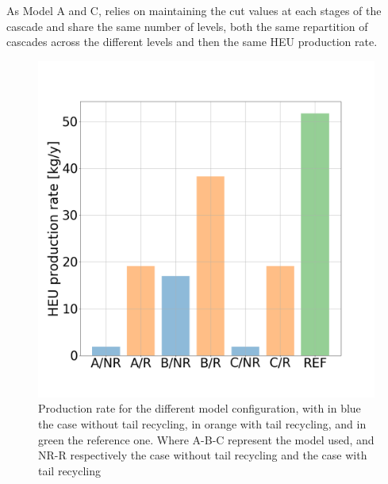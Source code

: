 As Model A and C, relies on maintaining the cut values at each stages of the
cascade and share the same number of levels, both the  same repartition of
cascades across the different levels and then the same \gls{HEU} production
rate.

\begin{figure}[h!] %
    \centering
    \includegraphics[scale=0.25]{HEU_prod_rate}
    \caption{Production rate for the different model configuration, with in blue
    the case without tail recycling, in orange with tail recycling, and in green
    the reference one. Where A-B-C represent the model used, and NR-R
    respectively the case without tail recycling and the case with tail recycling}
    \label{fig:HEU_rate}
\end{figure}
